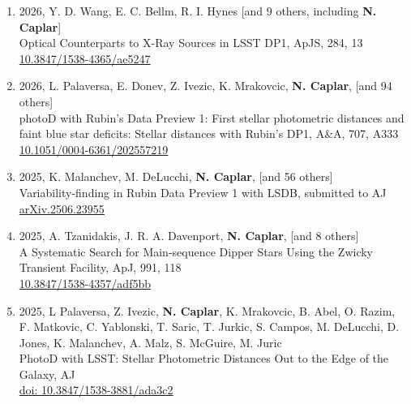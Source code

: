 \documentclass[11pt,letterpaper]{article}
\begin{document}
\begin{enumerate}
\item 2026, Y. D. Wang, E. C. Bellm, R. I. Hynes [and 9 others, including \textbf{N. Caplar}] \\
Optical Counterparts to X-Ray Sources in LSST DP1, ApJS, 284, 13 \\
\href{https://ui.adsabs.harvard.edu/link_gateway/2026ApJS..284...13W/doi:10.3847/1538-4365/ae5247}{10.3847/1538-4365/ae5247} \\

\item 2026, L. Palaversa, E. Donev, Z. Ivezic, K. Mrakovcic, \textbf{N. Caplar}, [and 94 others] \\
photoD with Rubin's Data Preview 1: First stellar photometric distances and faint blue star deficits: Stellar distances with Rubin's DP1, A\&A, 707, A333 \\
\href{https://ui.adsabs.harvard.edu/link_gateway/2026A&A...707A.333P/doi:10.1051/0004-6361/202557219}{10.1051/0004-6361/202557219} \\

\item 2025, K. Malanchev, M. DeLucchi, \textbf{N. Caplar}, [and 56 others]   \\
Variability-finding in Rubin Data Preview 1 with LSDB,  submitted to AJ\\
\href{https://ui.adsabs.harvard.edu/link_gateway/2025arXiv250623955M/doi:10.48550/arXiv.2506.23955}{arXiv.2506.23955} \\

\item 2025, A. Tzanidakis, J. R. A. Davenport, \textbf{N. Caplar}, [and 8 others] \\
A Systematic Search for Main-sequence Dipper Stars Using the Zwicky Transient Facility, ApJ, 991, 118 \\
\href{https://ui.adsabs.harvard.edu/link_gateway/2025ApJ...991..118T/doi:10.3847/1538-4357/adf5bb}{10.3847/1538-4357/adf5bb} \\

\item 2025, L Palaversa, Z. Ivezic, \textbf{N. Caplar}, K. Mrakovcic, B. Abel, O. Razim, F. Matkovic, C. Yablonski, T. Saric, T. Jurkic, S. Campos, M. DeLucchi, D. Jones, K. Malanchev, A. Malz, S. McGuire, M. Juric   \\
PhotoD with LSST: Stellar Photometric Distances Out to the Edge of the Galaxy,  AJ\\
\href{https://ui.adsabs.harvard.edu/link_gateway/2025AJ....169..119P/doi:10.3847/1538-3881/ada3c2}{doi: 10.3847/1538-3881/ada3c2} \\


\end{enumerate}
\end{document}
